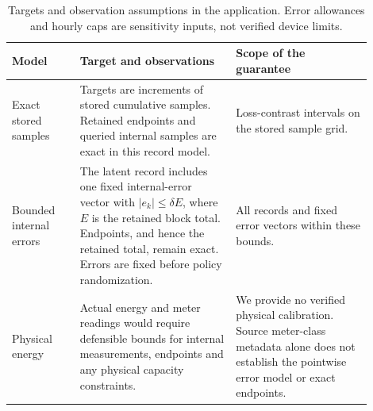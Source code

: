 \documentclass[12pt]{article}
\begin{document}
\begin{table}[htbp]
\centering\small
\caption{Targets and observation assumptions in the application. Error
allowances and hourly caps are sensitivity inputs, not verified device limits.}
\label{tab:measurement-assumptions}
\begin{tabular}{>{\raggedright\arraybackslash}p{0.17\linewidth}>{\raggedright\arraybackslash}p{0.39\linewidth}>{\raggedright\arraybackslash}p{0.34\linewidth}}
\toprule
Model & Target and observations & Scope of the guarantee\\
\midrule
Exact stored samples
& Targets are increments of stored cumulative samples. Retained endpoints
and queried internal samples are exact in this record model.
& Loss-contrast intervals on the stored sample grid.\\
Bounded internal errors
& The latent record includes one fixed internal-error vector with
$|e_k|\leq\delta E$, where $E$ is the retained block total. Endpoints, and hence the
retained total, remain exact. Errors are fixed before policy randomization.
& All records and fixed error vectors within these bounds.\\
Physical energy
& Actual energy and meter readings would require defensible bounds for
internal measurements, endpoints and any physical capacity constraints.
& We provide no verified physical calibration. Source meter-class metadata
alone does not establish the pointwise error model or exact endpoints.\\
\bottomrule
\end{tabular}
\end{table}
\end{document}
